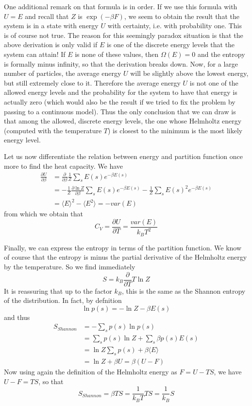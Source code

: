 \documentclass[a4paper, draft]{article}
\theoremstyle{own}
\theoremstyle{remark}
\begin{document}
One additional remark on that formula is in order. If we use this formula with $U=E$ and recall that $Z$ is $\exp(-\beta F)$, we seem to obtain the result that the system is in a state with energy $U$ with certainty, i.e. with probability one. This is of course not true. The reason for this seemingly paradox situation is that the above derivation is only valid if $E$ is one of the discrete energy levels that the system can attain! If $E$ is none of these values, then $\Omega(E) = 0$ and the entropy is formally minus infinity, so that the derivation breaks down. Now, for a large number of particles, the average energy $U$ will be slightly above the lowest energy, but still extremely close to it. Therefore the average energy $U$ is not one of the allowed energy levels and the probability for the system to have that energy is actually zero (which would also be the result if we tried to fix the problem by passing to a continuous model). Thus the only conclusion that we can draw is that among the allowed, discrete energy levels, the one whose Helmholtz energy (computed with the temperature $T$) is closest to the minimum is the most likely energy level.



Let us now differentiate the relation between energy and partition function once more to find the heat capacity. We have
\begin{align*}
\frac{\partial U}{\partial \beta} &= \frac{\partial }{\partial \beta} \frac{1}{Z} \sum_s E(s) e^{-\beta E(s)} \\
&= - \frac{1}{Z} \frac{\partial \ln Z}{\partial \beta} \sum_s E(s) e^{-\beta E(s)}
- \frac{1}{Z} \sum_s E(s)^2 e^{-\beta E(s)} \\
&= \langle E \rangle^2 - \langle E^2 \rangle = - var(E)
\end{align*}
from which we obtain that
$$
C_V = \frac{\partial U}{\partial T} = \frac{var(E)}{k_B T^2}
$$

Finally, we can express the entropy in terms of the partition function. We know of course that the entropy is minus the partial derivative of the Helmholtz energy by the temperature. So we find immediately
$$
S = k_B \frac{\partial}{\partial T} T \ln Z
$$
It is reassuring that up to the factor $k_B$, this is the same as the Shannon entropy of the distribution. In fact, by defnition 
$$
\ln p(s) = - \ln Z - \beta E(s)
$$
and thus
\begin{align*}
S_{Shannon} &= - \sum_s p(s) \ln p(s) \\
&= \sum_s p(s) \ln Z + \sum_s \beta p(s) E(s)  \\
&= \ln Z \sum_s p(s) + \beta \langle E \rangle \\
&= \ln Z + \beta U=  \beta (U - F)
\end{align*}
Now using again the definition of the Helmholtz energy as $F = U - TS$, we have $U - F = TS$, so that
$$
S_{Shannon} = \beta TS = \frac{1}{k_B T} {TS} = \frac{1}{k_B} {S}
$$
\end{document}
